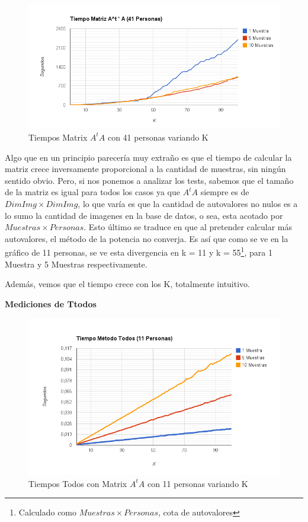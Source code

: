 \begin{figure}[H]
\includegraphics[width=1\textwidth]{img/image3.png}
     \caption{Tiempos Matrix $A^tA$ con 41 personas variando K}
\end{figure}

Algo que en un principio parecería muy extraño es que el tiempo de calcular la matriz crece
inversamente proporcional a la cantidad de muestras, sin ningún sentido obvio. Pero, si nos ponemos
a analizar los tests, sabemos que el tamaño de la matriz es igual para todos los casos ya que $A^tA$ siempre es de $DimImg \times DimImg$, lo que var\'ia es que la cantidad de autovalores no nulos es a lo sumo la cantidad de imagenes en la base de datos, o sea, esta acotado por $Muestras \times Personas$. Esto \'ultimo se traduce en que al pretender calcular m\'as autovalores, el m\'etodo de la potencia no converja. Es as\'i que como se ve en la gr\'afico de 11 personas, se ve esta divergencia en k = 11 y k = 55\footnote{Calculado como $Muestras \times Personas$, cota de autovalores}, para 1 Muestra y 5 Muestras respectivamente.

Además, vemos que el tiempo crece con los K, totalmente intuitivo.

\textbf{Mediciones de Ttodos }

\begin{figure}[H]
\includegraphics[width=1\textwidth]{img/image4.png}
     \caption{Tiempos Todos con Matrix $A^tA$ con 11 personas variando K}
\end{figure}

